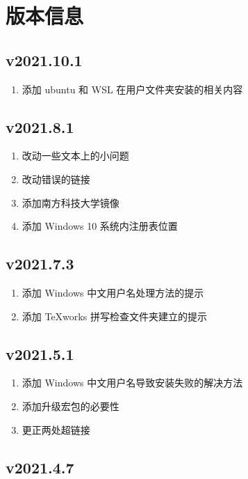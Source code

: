 
\chapter{版本信息}

\section*{v2021.10.1}

\begin{enumerate}
  \item 添加 ubuntu 和 WSL 在用户文件夹安装的相关内容
\end{enumerate}

\section*{v2021.8.1}

\begin{enumerate}
  \item 改动一些文本上的小问题
  \item 改动错误的链接
  \item 添加南方科技大学镜像
  \item 添加 Windows 10 系统内注册表位置
\end{enumerate}

\section*{v2021.7.3}

\begin{enumerate}
  \item 添加 Windows 中文用户名处理方法的提示
  \item 添加 \TeX works 拼写检查文件夹建立的提示
\end{enumerate}

\section*{v2021.5.1}

\begin{enumerate}
  \item 添加 Windows 中文用户名导致安装失败的解决方法
  \item 添加升级宏包的必要性
  \item 更正两处超链接
\end{enumerate}

\section*{v2021.4.7}

